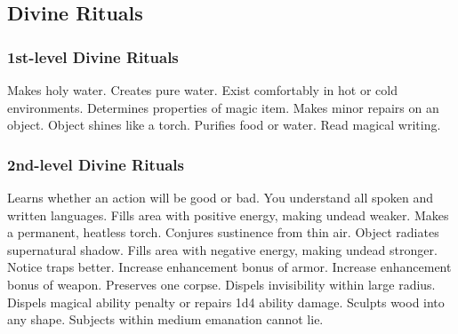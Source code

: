 \subsection{Divine Rituals}\label{Divine Rituals}
\subsubsection{1st-level Divine Rituals}
\begin{rituallist}
     Makes holy water.
     Creates pure water.
     Exist comfortably in hot or cold environments.
     Determines properties of magic item.
     Makes minor repairs on an object.
     Object shines like a torch.
     Purifies food or water.
     Read magical writing.
\end{rituallist}

\subsubsection{2nd-level Divine Rituals}
\begin{rituallist}
    \M\F Learns whether an action will be good or bad.
     You understand all spoken and written languages.
     Fills area with positive energy, making undead weaker.
     Makes a permanent, heatless torch.
     Conjures sustinence from thin air.
     Object radiates supernatural shadow.
     Fills area with negative energy, making undead stronger.
     Notice traps better.
     Increase enhancement bonus of armor.
     Increase enhancement bonus of weapon.
     Preserves one corpse.
     Dispels invisibility within large radius.
     Dispels magical ability penalty or repairs 1d4 ability damage.
     Sculpts wood into any shape.
     Subjects within medium emanation cannot lie.
\end{rituallist}

